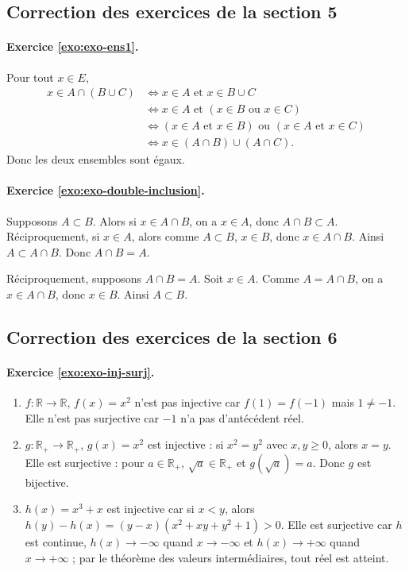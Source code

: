 \documentclass[11pt,a4paper]{article}
\newcommand{\R}{\mathbb{R}}
\begin{document}
\subsection*{Correction des exercices de la section 5}

\paragraph{Exercice \ref{exo:exo-ens1}.}
Pour tout $x\in E$,
\begin{align*}
x\in A\cap(B\cup C)
&\Longleftrightarrow x\in A\text{ et }x\in B\cup C\\
&\Longleftrightarrow x\in A\text{ et }(x\in B\text{ ou }x\in C)\\
&\Longleftrightarrow (x\in A\text{ et }x\in B)\text{ ou }(x\in A\text{ et }x\in C)\\
&\Longleftrightarrow x\in(A\cap B)\cup(A\cap C).
\end{align*}
Donc les deux ensembles sont égaux.

\paragraph{Exercice \ref{exo:exo-double-inclusion}.}
Supposons $A\subset B$. Alors si $x\in A\cap B$, on a $x\in A$, donc $A\cap B\subset A$. Réciproquement, si $x\in A$, alors comme $A\subset B$, $x\in B$, donc $x\in A\cap B$. Ainsi $A\subset A\cap B$. Donc $A\cap B=A$.

Réciproquement, supposons $A\cap B=A$. Soit $x\in A$. Comme $A=A\cap B$, on a $x\in A\cap B$, donc $x\in B$. Ainsi $A\subset B$.

\subsection*{Correction des exercices de la section 6}

\paragraph{Exercice \ref{exo:exo-inj-surj}.}
\begin{enumerate}
  \item $f:\R\to\R$, $f(x)=x^2$ n'est pas injective car $f(1)=f(-1)$ mais $1\neq-1$. Elle n'est pas surjective car $-1$ n'a pas d'antécédent réel.
  \item $g:\R_+\to\R_+$, $g(x)=x^2$ est injective : si $x^2=y^2$ avec $x,y\geq0$, alors $x=y$. Elle est surjective : pour $a\in\R_+$, $\sqrt a\in\R_+$ et $g(\sqrt a)=a$. Donc $g$ est bijective.
  \item $h(x)=x^3+x$ est injective car si $x<y$, alors $h(y)-h(x)=(y-x)(x^2+xy+y^2+1)>0$. Elle est surjective car $h$ est continue, $h(x)\to-\infty$ quand $x\to-\infty$ et $h(x)\to+\infty$ quand $x\to+\infty$ ; par le théorème des valeurs intermédiaires, tout réel est atteint.
\end{enumerate}
\end{document}
